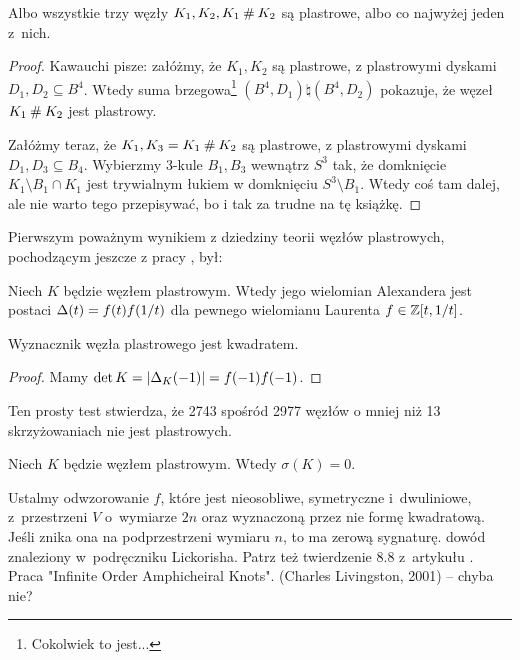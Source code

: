 \begin{proposition}
    Albo wszystkie trzy węzły $K_1, K_2, K_1 \mathbin{\#} K_2$ są plastrowe, albo co najwyżej jeden z~nich.
\end{proposition}

\begin{proof}
    Kawauchi \cite[s. 155]{kawauchi96} pisze: załóżmy, że $K_1, K_2$ są plastrowe, z plastrowymi dyskami $D_1, D_2 \subseteq B^4$.
    Wtedy suma brzegowa\footnote{Cokolwiek to jest...} $(B^4, D_1) \natural (B^4, D_2)$ pokazuje, że węzeł $K_1 \mathbin{\#} K_2$ jest plastrowy.

    Załóżmy teraz, że $K_1, K_3 = K_1 \mathbin{\#} K_2$ są plastrowe, z plastrowymi dyskami $D_1, D_3 \subseteq B_4$.
    Wybierzmy 3-kule $B_1, B_3$ wewnątrz $S^3$ tak, że domknięcie $K_1 \setminus B_1 \cap K_1$ jest trywialnym łukiem w domknięciu $S^3 \setminus B_1$.
    Wtedy coś tam dalej, ale nie warto tego przepisywać, bo i tak za trudne na tę książkę.
\end{proof}

Pierwszym poważnym wynikiem z dziedziny teorii węzłów plastrowych, pochodzącym jeszcze z pracy \cite{fox66}, był:

\begin{proposition}
%
    Niech $K$ będzie węzłem plastrowym.
    Wtedy jego wielomian Alexandera jest postaci $\Delta(t) = f(t) f(1/t)$ dla pewnego wielomianu Laurenta $f \in \mathbb Z[t, 1/t]$.
\end{proposition}

\begin{corollary}
    Wyznacznik węzła plastrowego jest kwadratem.
\end{corollary}

\begin{proof}
    Mamy $\det K = |\Delta_K(-1)| = f(-1) f(-1)$.
\end{proof}

Ten prosty test stwierdza, że 2743 spośród 2977 węzłów o mniej niż 13 skrzyżowaniach nie jest plastrowych.

\begin{proposition}
%
    Niech $K$ będzie węzłem plastrowym.
    Wtedy $\sigma(K) = 0$.
\end{proposition}

\begin{tobedone}
    Ustalmy odwzorowanie $f$, które jest nieosobliwe, symetryczne i~dwuliniowe, z~przestrzeni $V$ o~wymiarze $2n$ oraz wyznaczoną przez nie formę kwadratową.
    Jeśli znika ona na podprzestrzeni wymiaru $n$, to ma zerową sygnaturę.
    dowód znaleziony w~podręczniku Lickorisha.
    Patrz też twierdzenie 8.8 z~artykułu \cite{murasugi65}.
    Praca "Infinite Order Amphicheiral Knots". (Charles Livingston, 2001) -- chyba nie?
\end{tobedone}

